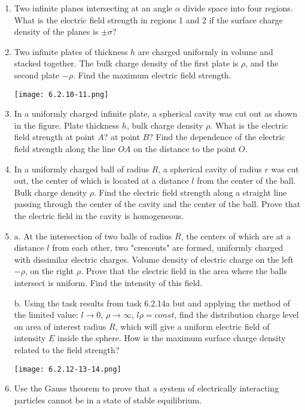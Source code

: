 \documentclass{article}
\begin{document}
\begin{enumerate}[label=6.2.\arabic*]
\item Two infinite planes intersecting at an angle $\alpha$ divide space into four regions. What is the electric field strength in regions 1 and 2 if the surface charge density of the planes is $\pm \sigma$?

\item Two infinite plates of thickness $h$ are charged uniformly in volume and stacked together. The bulk charge density of the first plate is $\rho$, and the second plate $- \rho$. Find the maximum electric field strength.

\begin{center}
    \texttt{[image: 6.2.10-11.png]}
\end{center}

\item In a uniformly charged infinite plate, a spherical cavity was cut out as shown in the figure. Plate thickness $h$, bulk charge density $\rho$. What is the electric field strength at point $A$? at point $B$? Find the dependence of the electric field strength along the line $OA$ on the distance to the point $O$.

\item In a uniformly charged ball of radius $R$, a spherical cavity of radius $r$ was cut out, the center of which is located at a distance $l$ from the center of the ball. Bulk charge density $\rho$. Find the electric field strength along a straight line passing through the center of the cavity and the center of the ball. Prove that the electric field in the cavity is homogeneous.

\item a. At the intersection of two balls of radius $R$, the centers of which are at a distance $l$ from each other, two "crescents" are formed, uniformly charged with dissimilar electric charges. Volume density of electric charge on the left $- \rho$, on the right $\rho$. Prove that the electric field in the area where the balls intersect is uniform. Find the intensity of this field. 

b. Using the task results from task 6.2.14a but and applying the method of the limited value: $l \to 0$, $\rho \to \infty$, $l \rho = const$, find the distribution charge level on area of interest radius $R$, which will give a uniform electric field of intensity $E$ inside the sphere. How is the maximum surface charge density related to the field strength?

\begin{center}
    \texttt{[image: 6.2.12-13-14.png]}
\end{center}

\item Use the Gauss theorem to prove that a system of electrically interacting particles cannot be in a state of stable equilibrium.

\end{enumerate}
\end{document}
